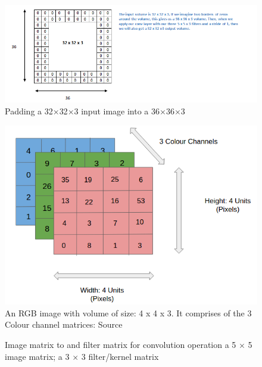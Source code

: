 \documentclass[master]{thesis-uestc}
\begin{document}
\begin{figure}[ht]
\includegraphics[width=7in]{pic/padding.png}
\caption{Padding a 32$\times$32$\times$3 input image into a 36$\times$36$\times$3}
\label{fig_padding}
\end{figure}

\begin{figure}[ht]
\includegraphics[width=5in]{pic/rgb_image.png}
\caption{An RGB image with volume of size: 4 x 4 x 3. It comprises of the 3 Colour channel matrices: Source \cite{Abhineet}}
\label{rgb_image}
\end{figure}

\begin{figure}%
\centering
{}%
\hspace{8pt}%
\caption[Image matrix to and filter matrix for convolution operation]{Image matrix to and filter matrix for convolution operation
 a 5 $\times$ 5 image matrix;
 a 3 $\times$ 3 filter/kernel matrix}
\label{fig:convolution}
\end{figure}
\end{document}
